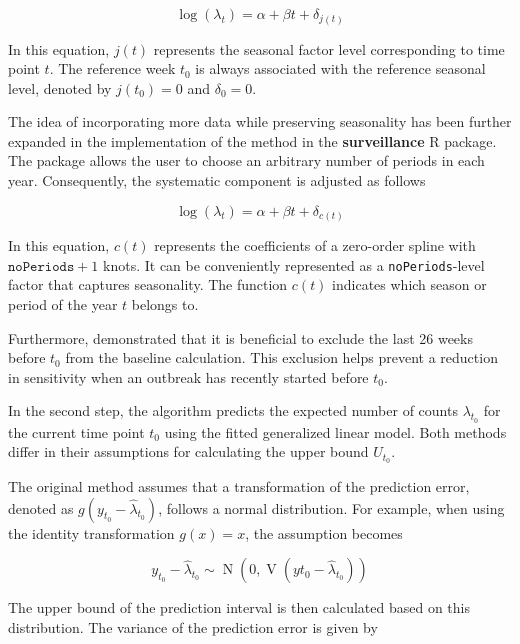 \documentclass[a4paper,twoside,11pt]{report} %
\DeclareMathOperator{\V}{V}
\DeclareMathOperator{\N}{N}
\theoremstyle{definition}
\theoremstyle{definition}
\theoremstyle{definition}
\theoremstyle{definition}
\theoremstyle{remark}
\begin{document}
\begin{equation}
\log(\lambda_t) = \alpha + \beta t + \delta_{j(t)}
\end{equation}

In this equation, \(j(t)\) represents the seasonal factor level corresponding to time point \(t\). The reference week \(t_0\) is always associated with the reference seasonal level, denoted by \(j(t_0) = 0\) and \(\delta_0 = 0\).

The idea of incorporating more data while preserving seasonality has been further expanded in the implementation of the method in the \textbf{surveillance} R package. The package allows the user to choose an arbitrary number of periods in each year. Consequently, the systematic component is adjusted as follows

\begin{equation}
\log(\lambda_t) = \alpha + \beta t + \delta_{c(t)}
\end{equation}

In this equation, \(c(t)\) represents the coefficients of a zero-order spline with \(\mathtt{noPeriods}+1\) knots. It can be conveniently represented as a \texttt{noPeriods}-level factor that captures seasonality. The function \(c(t)\) indicates which season or period of the year \(t\) belongs to.

Furthermore, \textcite{Noufaily_2013} demonstrated that it is beneficial to exclude the last 26 weeks before \(t_0\) from the baseline calculation. This exclusion helps prevent a reduction in sensitivity when an outbreak has recently started before \(t_0\).

In the second step, the algorithm predicts the expected number of counts \(\lambda_{t_0}\) for the current time point \(t_0\) using the fitted generalized linear model. Both methods differ in their assumptions for calculating the upper bound \(U_{t_0}\).

The original method assumes that a transformation of the prediction error, denoted as \(g(y_{t_0}-\hat{\lambda}_{t_0})\), follows a normal distribution. For example, when using the identity transformation \(g(x)=x\), the assumption becomes

\begin{equation}
y_{t_0} - \hat{\lambda}_{t_0} \sim \N(0, \V(y{t_0}-\hat{\lambda}_{t_0}))
\end{equation}

The upper bound of the prediction interval is then calculated based on this distribution. The variance of the prediction error is given by
\end{document}
